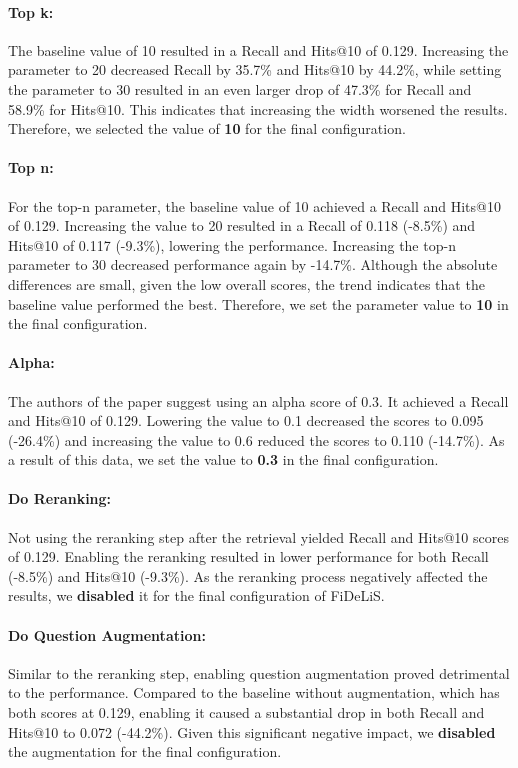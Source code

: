 \paragraph{Top k:} 
The baseline value of 10 resulted in a Recall and Hits@10 of 0.129. Increasing the parameter to 20 decreased Recall by 35.7\% and Hits@10 by 44.2\%, while setting the parameter to 30 resulted in an even larger drop of 47.3\% for Recall and 58.9\% for Hits@10. This indicates that increasing the width worsened the results. Therefore, we selected the value of \textbf{10} for the final configuration.

\paragraph{Top n:} 
For the top-n parameter, the baseline value of 10 achieved a Recall and Hits@10 of 0.129. Increasing the value to 20 resulted in a Recall of 0.118 (-8.5\%) and Hits@10 of 0.117 (-9.3\%), lowering the performance. Increasing the top-n parameter to 30 decreased performance again by -14.7\%. Although the absolute differences are small, given the low overall scores, the trend indicates that the baseline value performed the best. Therefore, we set the parameter value to \textbf{10} in the final configuration.

\paragraph{Alpha:}
The authors of the paper suggest using an alpha score of 0.3. It achieved a Recall and Hits@10 of 0.129. Lowering the value to 0.1 decreased the scores to 0.095 (-26.4\%) and increasing the value to 0.6 reduced the scores to 0.110 (-14.7\%). As a result of this data, we set the value to \textbf{0.3} in the final configuration.

\paragraph{Do Reranking:} 
Not using the reranking step after the retrieval yielded Recall and Hits@10 scores of 0.129. Enabling the reranking resulted in lower performance for both Recall (-8.5\%) and Hits@10 (-9.3\%). As the reranking process negatively affected the results, we \textbf{disabled} it for the final configuration of FiDeLiS.

\paragraph{Do Question Augmentation:}
Similar to the reranking step, enabling question augmentation proved detrimental to the performance. Compared to the baseline without augmentation, which has both scores at 0.129, enabling it caused a substantial drop in both Recall and Hits@10 to 0.072 (-44.2\%). Given this significant negative impact, we \textbf{disabled} the augmentation for the final configuration.

